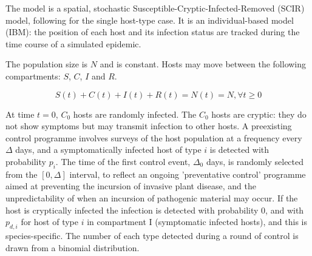 \documentclass[11pt,letterpaper]{article}
\begin{document}
The model is a spatial, stochastic Susceptible-Cryptic-Infected-Removed (SCIR) model, following \cite{HyattTwynam2017} for the single host-type case. It is an individual-based model (IBM):  the position of each host and its infection status are tracked during the time course of a simulated epidemic.


% 



The population size is $N$ and is constant. Hosts may move between the following compartments: $S$, $C$, $I$ and $R$.

\begin{equation}
	S(t) + C(t) + I(t) + R(t) = N(t) = N,   \forall t \ge 0 
\end{equation}

At time $t = 0$, $C_0$ hosts are randomly infected. The $C_{0}$ hosts are cryptic: they do not show symptoms but may transmit infection to other hosts. A preexisting control programme involves surveys of the host population at a frequency every $\Delta$ days, and a symptomatically infected host of type $i$ is detected with probability $p_i$. The time of the first control event, $\Delta_{0}$ days, is randomly selected from the  $[0, \Delta]$ interval, to reflect an ongoing 'preventative control' programme aimed at preventing the incursion of invasive plant disease, and the unpredictability of when an incursion of pathogenic material may occur. If the host is cryptically infected the infection is detected with probability 0, and with $p_{d, i}$ for host of type $i$ in compartment I (symptomatic infected hosts), and this is species-specific. The number of each type detected during a round of control is drawn from a binomial distribution.
\end{document}
